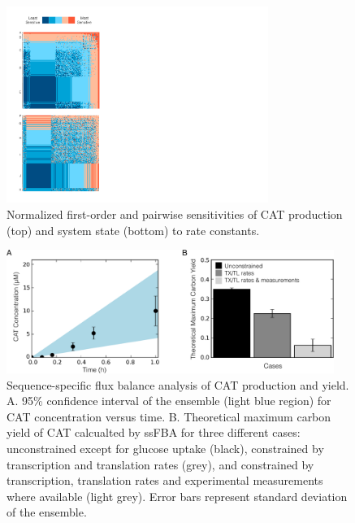 \documentclass[12pt]{article}
\begin{document}
\begin{figure}[ht]
\centering
\includegraphics[width=0.76\textwidth,trim=0 28 615 40,clip]{./Figures/Sensitivity.pdf}
\caption{Normalized first-order and pairwise sensitivities of CAT production (top) and system state (bottom) to rate constants.}
\label{fig:Sensitivity}
\end{figure}

\begin{figure}[ht]
\centering
\includegraphics[width=0.95\textwidth]{./Figures/CAT_prod_yield.pdf}
\caption{Sequence-specific flux balance analysis of CAT production and yield. A. 95\% confidence interval of the ensemble (light blue region) for CAT concentration versus time. B. Theoretical maximum carbon yield of CAT calcualted by ssFBA for three different cases: unconstrained except for glucose uptake (black), constrained by transcription and translation rates (grey), and constrained by transcription, translation rates and experimental measurements where available (light grey). Error bars represent standard deviation of the ensemble.}
\label{fig:CATProdYield}
\end{figure}
\end{document}
